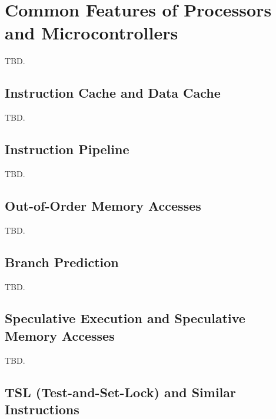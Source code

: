 \section{Common Features of Processors and Microcontrollers}
\label{scfp0}

TBD.


\subsection{Instruction Cache and Data Cache}
\label{scfp0:sicd0}

TBD.


\subsection{Instruction Pipeline}
\label{scfp0:spip0}

TBD.


\subsection{Out-of-Order Memory Accesses}
\label{scfp0:soom0}

TBD.


\subsection{Branch Prediction}
\label{scfp0:sbpd0}

TBD.


\subsection{Speculative Execution and Speculative Memory Accesses}
\label{scfp0:sses0}

TBD.


\subsection{TSL (Test-and-Set-Lock) and Similar Instructions}
\label{scfp0:stsl0}

